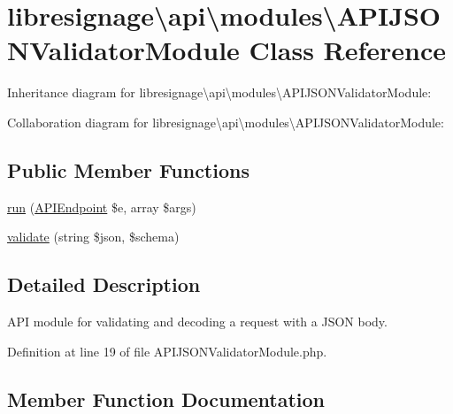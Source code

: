 \hypertarget{classlibresignage_1_1api_1_1modules_1_1APIJSONValidatorModule}{}\section{libresignage\textbackslash{}api\textbackslash{}modules\textbackslash{}A\+P\+I\+J\+S\+O\+N\+Validator\+Module Class Reference}
\label{classlibresignage_1_1api_1_1modules_1_1APIJSONValidatorModule}


Inheritance diagram for libresignage\textbackslash{}api\textbackslash{}modules\textbackslash{}A\+P\+I\+J\+S\+O\+N\+Validator\+Module\+:


Collaboration diagram for libresignage\textbackslash{}api\textbackslash{}modules\textbackslash{}A\+P\+I\+J\+S\+O\+N\+Validator\+Module\+:
\subsection*{Public Member Functions}
\begin{DoxyCompactItemize}
\item 
\hyperlink{classlibresignage_1_1api_1_1modules_1_1APIJSONValidatorModule_a2c609f4338c3bf3f2b35f4daf6728a40}{run} (\hyperlink{classlibresignage_1_1api_1_1APIEndpoint}{A\+P\+I\+Endpoint} \$e, array \$args)
\item 
\hyperlink{classlibresignage_1_1api_1_1modules_1_1APIJSONValidatorModule_a72e941a65c34a98c8767f515ef9f9157}{validate} (string \$json, \$schema)
\end{DoxyCompactItemize}


\subsection{Detailed Description}
A\+PI module for validating and decoding a request with a J\+S\+ON body. 

Definition at line 19 of file A\+P\+I\+J\+S\+O\+N\+Validator\+Module.\+php.



\subsection{Member Function Documentation}
\mbox{\label{classlibresignage_1_1api_1_1modules_1_1APIJSONValidatorModule_a2c609f4338c3bf3f2b35f4daf6728a40}} 
